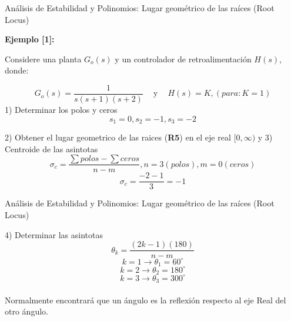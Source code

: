 \documentclass{beamer}
\begin{document}
\begin{frame}{Análisis de Estabilidad y Polinomios: Lugar geométrico de las raíces (Root Locus)}
\begin{justify}
\textbf{Ejemplo [1]:}

\vspace{0.3cm}
Considere una planta $G_o(s)$ y un controlador de retroalimentación $H(s)$, donde:

{\small
\begin{equation*}\label{rl-ejemplo-1}
    G_o(s) = \frac{1}{s(s+1)(s+2)}  \  \ \ \  \text{ y } \ \ \ \ H(s) = K, (para: K=1)
\end{equation*}
}
1) Determinar los polos y ceros
{\small
\begin{equation*}\label{rl-ejemplo-1}
    s_1=0, s_2=-1, s_3=-2
\end{equation*}
}

2) Obtener el lugar geometrico de las raices (\textbf{R5}) en el eje real  $[0, \infty)$
y 3) Centroide de las asintotas 
{\small
\begin{equation*}\label{rl-ejemplo-1}
    \sigma_c = \frac{\sum polos - \sum ceros}{n-m}, n=3 (polos), m=0 (ceros)
\end{equation*}
}
{\small
\begin{equation*}\label{rl-ejemplo-1}
    \sigma_c = \frac{-2 - 1}{3}=-1
\end{equation*}
}
\end{justify}
\end{frame}

\begin{frame}{Análisis de Estabilidad y Polinomios: Lugar geométrico de las raíces (Root Locus)}
\begin{justify}
\begin{itemize}
4) Determinar las asintotas
{\small
\begin{equation*}\label{rl-ejemplo-1}
    \theta_k = \frac{(2k-1)(180)}{n-m}
\end{equation*}
}
{\small
\begin{equation*}\label{rl-ejemplo-2}
   k=1 \rightarrow \theta_1 = 60^\circ
\end{equation*}
}
{\small
\begin{equation*}\label{rl-ejemplo-2}
   k=2 \rightarrow \theta_2 = 180^\circ
\end{equation*}
}
{\small
\begin{equation*}\label{rl-ejemplo-2}
   k=3 \rightarrow \theta_3 = 300^\circ
\end{equation*}
}
\\
Normalmente encontrará que un ángulo es la reflexión respecto al eje Real del otro ángulo.
\end{itemize}
\end{justify}
\end{frame}
\end{document}
